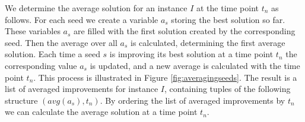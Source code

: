 \documentclass[a4paper,12pt,titlepage, BCOR7mm,headsepline]{scrbook}
\numberwithin{equation}{section}
\begin{document}
We determine the average solution for an instance $I$ at the time point $t_n$ as follows. For each seed we create a variable $a_s$ storing the best solution so far. These variables $a_s$ are filled with the first solution created by the corresponding seed. Then the average over all $a_s$ is calculated, determining the first average solution. Each time a seed $s$ is improving its best solution at a time point $t_n$ the corresponding value $a_s$ is updated, and a new average is calculated with the time point $t_n$. This process is illustrated in Figure \ref{fig:averagingseeds}. The result is a list of averaged improvements for instance $I$, containing tuples of the following structure $(avg(a_s), t_n)$. By ordering the list of averaged improvements by $t_n$ we can calculate the average solution at a time point $t_n$.
\end{document}
